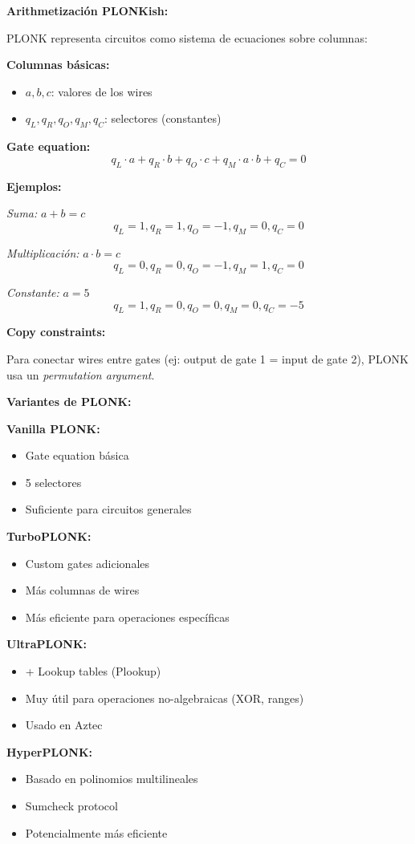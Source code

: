 \documentclass[11pt,a4paper,twoside,openright]{book}
\theoremstyle{definition}
\theoremstyle{plain}
\theoremstyle{remark}
\begin{document}
\begin{mathnote}
\textbf{Arithmetización PLONKish:}

PLONK representa circuitos como sistema de ecuaciones sobre columnas:

\textbf{Columnas básicas:}
\begin{itemize}
    \item $a, b, c$: valores de los wires
    \item $q_L, q_R, q_O, q_M, q_C$: selectores (constantes)
\end{itemize}

\textbf{Gate equation:}
\[ q_L \cdot a + q_R \cdot b + q_O \cdot c + q_M \cdot a \cdot b + q_C = 0 \]

\textbf{Ejemplos:}

\textit{Suma:} $a + b = c$
\[ q_L=1, q_R=1, q_O=-1, q_M=0, q_C=0 \]

\textit{Multiplicación:} $a \cdot b = c$
\[ q_L=0, q_R=0, q_O=-1, q_M=1, q_C=0 \]

\textit{Constante:} $a = 5$
\[ q_L=1, q_R=0, q_O=0, q_M=0, q_C=-5 \]

\textbf{Copy constraints:}

Para conectar wires entre gates (ej: output de gate 1 = input de gate 2), PLONK usa un \textit{permutation argument}.
\end{mathnote}

\begin{keyidea}
\textbf{Variantes de PLONK:}

\textbf{Vanilla PLONK:}
\begin{itemize}
    \item Gate equation básica
    \item 5 selectores
    \item Suficiente para circuitos generales
\end{itemize}

\textbf{TurboPLONK:}
\begin{itemize}
    \item Custom gates adicionales
    \item Más columnas de wires
    \item Más eficiente para operaciones específicas
\end{itemize}

\textbf{UltraPLONK:}
\begin{itemize}
    \item + Lookup tables (Plookup)
    \item Muy útil para operaciones no-algebraicas (XOR, ranges)
    \item Usado en Aztec
\end{itemize}

\textbf{HyperPLONK:}
\begin{itemize}
    \item Basado en polinomios multilineales
    \item Sumcheck protocol
    \item Potencialmente más eficiente
\end{itemize}
\end{keyidea}
\end{document}

